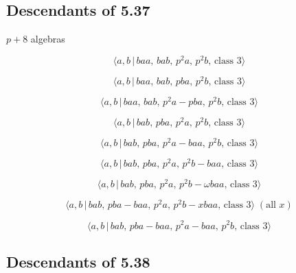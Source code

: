 \documentclass[10pt]{article}
\begin{document}
\subsection{Descendants of 5.37}

$p+8$ algebras

\begin{equation}
\langle a,b\,|\,baa,\,bab,\,p^2a,\,p^2b,\,\text{class }3\rangle  \tag{6.385}
\end{equation}

\begin{equation}
\langle a,b\,|\,baa,\,bab,\,pba,\,p^2b,\,\text{class }3\rangle  \tag{6.386}
\end{equation}

\begin{equation}
\langle a,b\,|\,baa,\,bab,\,p^2a-pba,\,p^2b,\,\text{class }3\rangle 
\tag{6.387}
\end{equation}

\begin{equation}
\langle a,b\,|\,bab,\,pba,\,p^2a,\,p^2b,\,\text{class }3\rangle  \tag{6.388}
\end{equation}

\begin{equation}
\langle a,b\,|\,bab,\,pba,\,p^2a-baa,\,p^2b,\,\text{class }3\rangle 
\tag{6.389}
\end{equation}

\begin{equation}
\langle a,b\,|\,bab,\,pba,\,p^2a,\,p^2b-baa,\,\text{class }3\rangle 
\tag{6.390}
\end{equation}

\begin{equation}
\langle a,b\,|\,bab,\,pba,\,p^2a,\,p^2b-\omega baa,\,\text{class }3\rangle 
\tag{6.391}
\end{equation}

\begin{equation}
\langle a,b\,|\,bab,\,pba-baa,\,p^2a,\,p^2b-xbaa,\,\text{class }3\rangle\;(%
\text{all }x)  \tag{6.392}
\end{equation}

\begin{equation}
\langle a,b\,|\,bab,\,pba-baa,\,p^2a-baa,\,p^2b,\,\text{class }3\rangle 
\tag{6.393}
\end{equation}

\subsection{Descendants of 5.38}
\end{document}
